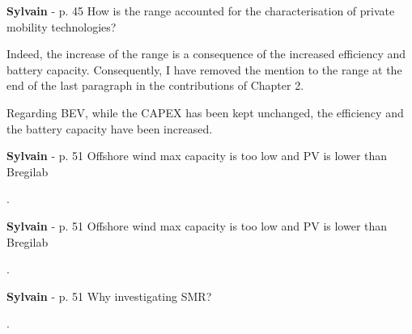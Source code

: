 \documentclass[12pt,a4paper]{article}
\begin{document}
\begin{mdframed}[style=comment] %
{\color{purple} \textbf{Sylvain}} - p. 45 How is the range accounted for the characterisation of private mobility technologies?
\end{mdframed}

\noindent Indeed, the increase of the range is a consequence of the increased efficiency and battery capacity. Consequently, I have removed the mention to the range {\color{blue}at the end of the last paragraph in the contributions of Chapter 2}.

\begin{mdframed}[style=manuscript] %
Regarding BEV, while the CAPEX has been kept unchanged, the efficiency and the battery capacity have been increased. 
\end{mdframed}

\begin{mdframed}[style=comment] %
{\color{purple} \textbf{Sylvain}} - p. 51 Offshore wind max capacity is too low and PV is lower than Bregilab
\end{mdframed}

\noindent {\color{blue} }.

\begin{mdframed}[style=manuscript] %

\end{mdframed}

\begin{mdframed}[style=comment] %
{\color{purple} \textbf{Sylvain}} - p. 51 Offshore wind max capacity is too low and PV is lower than Bregilab
\end{mdframed}

\noindent {\color{blue} }.

\begin{mdframed}[style=manuscript] %

\end{mdframed}

\begin{mdframed}[style=comment] %
{\color{purple} \textbf{Sylvain}} - p. 51 Why investigating SMR?
\end{mdframed}

\noindent {\color{blue} }.

\begin{mdframed}[style=manuscript] %

\end{mdframed}
\end{document}
